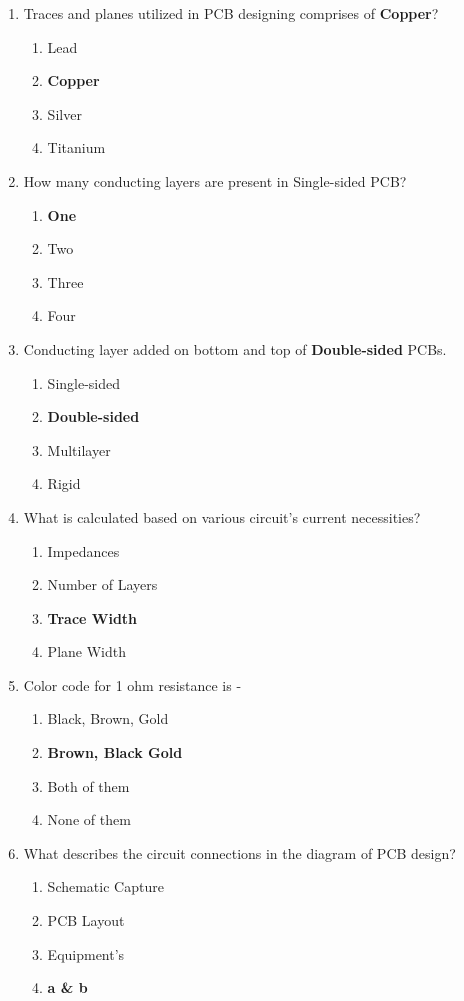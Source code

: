 \documentclass[a4paper,12pt]{article}
\begin{document}
\begin{enumerate}
		\item Traces and planes utilized in PCB designing comprises of \textbf{Copper}?
		\begin{enumerate}
			\item Lead
			\item \textbf{Copper}
			\item Silver
			\item Titanium
		\end{enumerate}
		
		\item How many conducting layers are present in Single-sided PCB?
		\begin{enumerate}
			\item \textbf{One}
			\item Two
			\item Three
			\item Four
		\end{enumerate}
		
		\item Conducting layer added on bottom and top of \textbf{Double-sided} PCBs.
		\begin{enumerate}
			\item Single-sided
			\item \textbf{Double-sided}
			\item Multilayer
			\item Rigid
		\end{enumerate}
		
		\item What is calculated based on various circuit's current necessities?
		\begin{enumerate}
			\item Impedances
			\item Number of Layers
			\item \textbf{Trace Width}
			\item Plane Width
		\end{enumerate}
		
		\item Color code for 1 ohm resistance is -
		\begin{enumerate}
			\item Black, Brown, Gold
			\item \textbf{Brown, Black Gold}
			\item Both of them
			\item None of them
		\end{enumerate}
		
		\item What describes the circuit connections in the diagram of PCB design?
		\begin{enumerate}
			\item Schematic Capture
			\item PCB Layout
			\item Equipment's
			\item \textbf{a \& b}
		\end{enumerate}
		

\end{enumerate}
\end{document}
